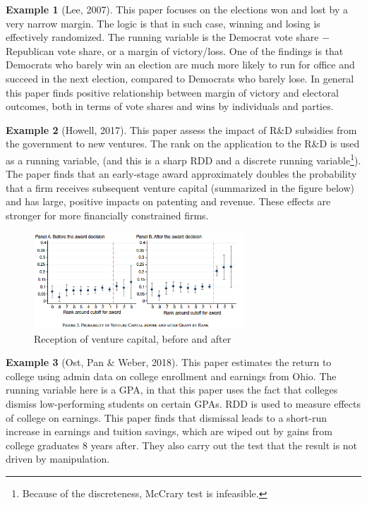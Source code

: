 \documentclass[12pt]{article}
\theoremstyle{definition}
\theoremstyle{property}
\theoremstyle{assumption}
\theoremstyle{example}
\newtheorem{example}{Example}[section]
\theoremstyle{comment}
\begin{document}
\begin{mdframed}[backgroundcolor=yellow!5] 
\begin{example}[Lee, 2007] This paper focuses on the elections won and lost by a very narrow margin. The logic is that in such case, winning and losing is effectively randomized. The running variable is the Democrat vote share $-$ Republican vote share, or a margin of victory/loss. One of the findings is that Democrats who barely win an election are much more likely to run for office and succeed in the next election, compared to Democrats who barely lose. In general this paper finds positive relationship between margin of victory and electoral outcomes, both in terms of vote shares and wins by individuals and parties. 
\end{example}


\begin{example}[Howell, 2017] This paper assess the impact of R\&D subsidies from the government to new ventures. The rank on the application to the R\&D is used as a running variable, (and this is a sharp RDD and a discrete running variable\footnote{Because of the discreteness, McCrary test is infeasible.}).  The paper finds that an early-stage award approximately doubles the probability that a firm receives subsequent venture capital (summarized in the figure below) and has large, positive impacts on patenting and revenue. These effects are stronger for more financially constrained firms.
\end{example}
\begin{figure}[H]
\centering
\includegraphics[width=0.7\textwidth, keepaspectratio]{RD_fig.png}
\caption{Reception of venture capital, before and after}
\end{figure}
\begin{example}[Ost, Pan \& Weber, 2018] This paper estimates the return to college using admin data on college enrollment and earnings from Ohio. The running variable here is a GPA, in that this paper uses the fact that colleges dismiss low-performing students on certain GPAs. RDD is used to measure effects of college on earnings. This paper finds that dismissal leads to a short-run increase in earnings and tuition savings, which are wiped out by gains from college graduates 8 years after. They also carry out the test that the result is not driven by manipulation.
\end{example}
\end{mdframed}
\end{document}
